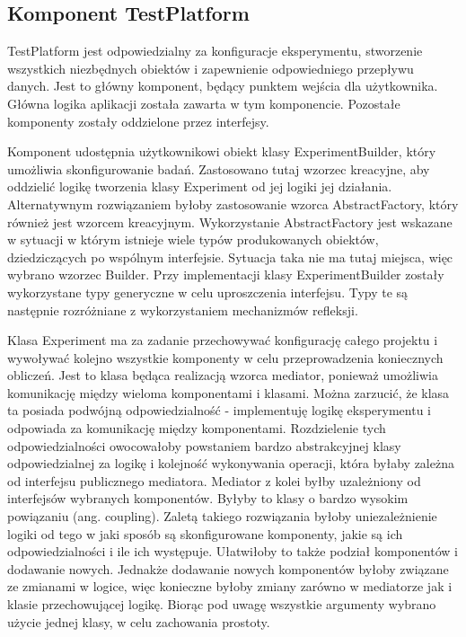 \documentclass[12pt]{article}
\begin{document}
\subsection{Komponent TestPlatform}

TestPlatform jest odpowiedzialny za konfiguracje eksperymentu, stworzenie wszystkich niezbędnych obiektów i zapewnienie odpowiedniego przepływu danych. Jest to główny komponent, będący punktem wejścia dla użytkownika. Główna logika aplikacji została zawarta w tym komponencie. Pozostałe komponenty zostały oddzielone przez interfejsy. 

Komponent udostępnia użytkownikowi obiekt klasy ExperimentBuilder, który umożliwia skonfigurowanie badań. Zastosowano tutaj wzorzec kreacyjne, aby oddzielić logikę tworzenia klasy Experiment od jej logiki jej działania. Alternatywnym rozwiązaniem byłoby zastosowanie wzorca AbstractFactory, który również jest wzorcem kreacyjnym. Wykorzystanie AbstractFactory jest wskazane w sytuacji w którym istnieje wiele typów produkowanych obiektów, dziedziczących po wspólnym interfejsie. Sytuacja taka nie ma tutaj miejsca, więc wybrano wzorzec Builder. Przy implementacji klasy ExperimentBuilder zostały wykorzystane typy generyczne w celu uproszczenia interfejsu. Typy te są następnie rozróżniane z wykorzystaniem mechanizmów refleksji.

Klasa Experiment ma za zadanie przechowywać konfigurację całego projektu i wywoływać kolejno wszystkie komponenty w celu przeprowadzenia koniecznych obliczeń. Jest to klasa będąca realizacją wzorca mediator, ponieważ umożliwia komunikację między wieloma komponentami i klasami. Można zarzucić, że klasa ta posiada podwójną odpowiedzialność - implementuję logikę eksperymentu i odpowiada za komunikację między komponentami. Rozdzielenie tych odpowiedzialności owocowałoby powstaniem bardzo abstrakcyjnej klasy odpowiedzialnej za logikę i kolejność wykonywania operacji, która byłaby zależna od interfejsu publicznego mediatora. Mediator z kolei byłby uzależniony od interfejsów wybranych komponentów. Byłyby to klasy o bardzo wysokim powiązaniu (ang. coupling). Zaletą takiego rozwiązania byłoby uniezależnienie logiki od tego w jaki sposób są skonfigurowane komponenty, jakie są ich odpowiedzialności i ile ich występuje. Ułatwiłoby to także podział komponentów i dodawanie nowych. Jednakże dodawanie nowych komponentów byłoby związane ze zmianami w logice, więc konieczne byłoby zmiany zarówno w mediatorze jak i klasie przechowującej logikę. Biorąc pod uwagę wszystkie argumenty wybrano użycie jednej klasy, w celu zachowania prostoty.
\end{document}
